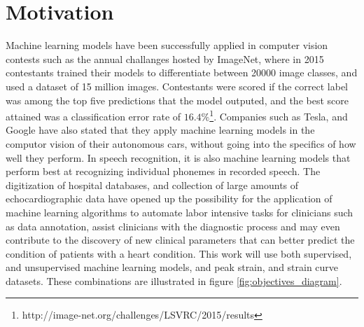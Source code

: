 \section{Motivation} \label{sec:motivation}

Machine learning models have been successfully applied in computer vision contests such as the annual challanges hosted by ImageNet, where in 2015 contestants trained their models to differentiate between 20000 image classes, and used a dataset of 15 million images. Contestants were scored if the correct label was among the top five predictions that the model outputed, and the best score attained was a classification error rate of $16.4\%$\footnote{http://image-net.org/challenges/LSVRC/2015/results}. Companies such as Tesla, and Google have also stated that they apply machine learning models in the computor vision of their autonomous cars, without going into the specifics of how well they perform. In speech recognition, it is also machine learning models that perform best at recognizing individual phonemes in recorded speech. The digitization of hospital databases, and collection of large amounts of echocardiographic data have opened up the possibility for the application of machine learning algorithms to automate labor intensive tasks for clinicians such as data annotation, assist clinicians with the diagnostic process and may even contribute to the discovery of new clinical parameters that can better predict the condition of patients with a heart condition. This work will use both supervised, and unsupervised machine learning models, and peak strain, and strain curve datasets. These combinations are illustrated in figure \ref{fig:objectives_diagram}.

